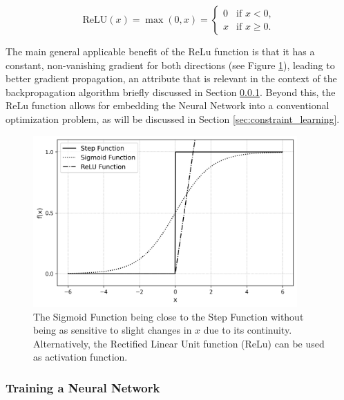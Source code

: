 \[
\text{ReLU}(x) = \max(0, x) = 
\begin{cases}
	0 & \text{if } x < 0, \\
	x & \text{if } x \geq 0.
\end{cases}
\]
 
 The main general applicable benefit of the ReLu function is that it has a constant, non-vanishing gradient for both directions (see Figure \ref{fig:activation_functions}), leading to better gradient propagation, an attribute that is relevant in the context of the backpropagation algorithm briefly discussed in Section \ref{subsubsec:training_nn}. \cite{preprintReLuGlorot}
 Beyond this, the ReLu function allows for embedding the Neural Network into a conventional optimization problem, as will be discussed in Section \ref{sec:constraint_learning}.

\begin{figure}[h] 
	\centering
	\includegraphics[width=0.9\textwidth]{figures/modelling/activation_functions.png} %
	\caption{The Sigmoid Function being close to the Step Function without being as sensitive to slight changes in $x$ due to its continuity. Alternatively, the Rectified Linear Unit function (ReLu) can be used as activation function. }
	\label{fig:activation_functions}
\end{figure}

\cite{nielsen2015neuralChap1}


\subsubsection{Training a Neural Network} \label{subsubsec:training_nn}

